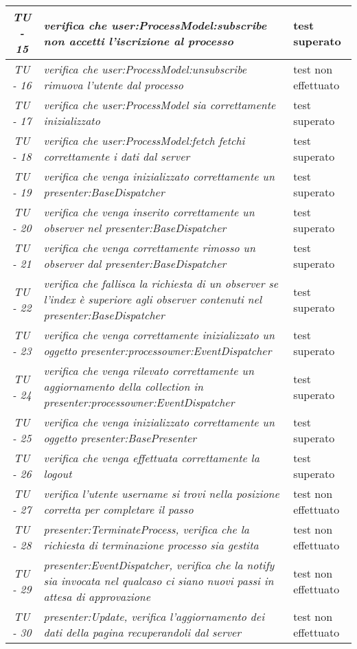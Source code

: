 \begin{small}\centering
\begin{tabular}{|c|p{8.0cm}|p{2.0cm}|}
\hline
\textit{TU - 15} &
\textit{verifica che user:ProcessModel:subscribe non accetti l'iscrizione al processo} &  test superato\\
\hline
\textit{TU - 16} &
\textit{verifica che user:ProcessModel:unsubscribe rimuova l'utente dal processo} &  test non effettuato\\
\hline
\textit{TU - 17} &
\textit{verifica che user:ProcessModel sia correttamente inizializzato} & test superato \\
\hline
\textit{TU - 18} &
\textit{verifica che user:ProcessModel:fetch fetchi correttamente i dati dal server } & test superato \\
\hline
\textit{TU - 19} &
\textit{verifica che venga inizializzato correttamente un presenter:BaseDispatcher} & test superato \\
\hline
\textit{TU - 20} &
\textit{ verifica che venga inserito correttamente un observer nel presenter:BaseDispatcher } & test superato \\
\hline
\textit{TU - 21} &
\textit{ verifica che venga correttamente rimosso un observer dal presenter:BaseDispatcher} & test superato \\
\hline
\textit{TU - 22} &
\textit{ verifica che fallisca la richiesta di un observer se l'index è superiore agli observer contenuti nel presenter:BaseDispatcher} & test superato \\
\hline
\textit{TU - 23} &
\textit{verifica che venga correttamente inizializzato un oggetto presenter:processowner:EventDispatcher } & test superato \\
\hline
\textit{TU - 24} &
\textit{verifica che venga rilevato correttamente un aggiornamento della collection in presenter:processowner:EventDispatcher} & test superato \\
\hline
\textit{TU - 25} &
\textit{verifica che venga inizializzato correttamente un oggetto presenter:BasePresenter } & test superato \\
\hline
\textit{TU - 26} &
\textit{verifica che venga effettuata correttamente la logout } & test superato \\
\hline
\textit{TU - 27} &
\textit{verifica l'utente username si trovi nella posizione corretta per completare il passo } & test non effettuato \\
\hline
\textit{TU - 28} &
\textit{presenter:TerminateProcess, verifica che la richiesta di terminazione processo sia gestita } & test non effettuato \\
\hline
\textit{TU - 29} &
\textit{presenter:EventDispatcher, verifica che la notify sia invocata nel qualcaso ci siano nuovi passi in attesa di approvazione } & test non effettuato \\
\hline
\textit{TU - 30} &
\textit{presenter:Update, verifica l'aggiornamento dei dati della pagina recuperandoli dal server} & test non effettuato \\
\hline
\end{tabular}\\
\end{small}